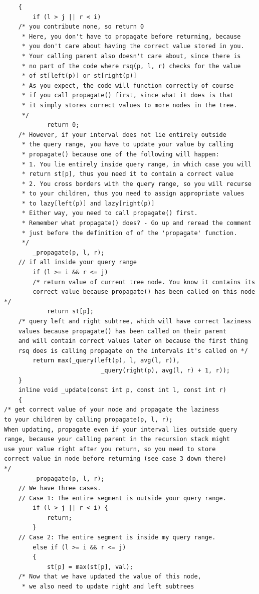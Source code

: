 \documentclass[12pt]{book}
\begin{document}
\begin{verbatim}
	{
		if (l > j || r < i)
	/* you contribute none, so return 0
	 * Here, you don't have to propagate before returning, because
	 * you don't care about having the correct value stored in you.
	 * Your calling parent also doesn't care about, since there is
	 * no part of the code where rsq(p, l, r) checks for the value
	 * of st[left(p)] or st[right(p)]
	 * As you expect, the code will function correctly of course
	 * if you call propagate() first, since what it does is that
	 * it simply stores correct values to more nodes in the tree.
	 */
			return 0;
	/* However, if your interval does not lie entirely outside
	 * the query range, you have to update your value by calling
	 * propagate() because one of the following will happen:
	 * 1. You lie entirely inside query range, in which case you will
	 * return st[p], thus you need it to contain a correct value
	 * 2. You cross borders with the query range, so you will recurse
	 * to your children, thus you need to assign appropriate values
	 * to lazy[left(p)] and lazy[right(p)]
	 * Either way, you need to call propagate() first.
	 * Remember what propagate() does? - Go up and reread the comment
	 * just before the definition of of the 'propagate' function.
	 */
		_propagate(p, l, r);
	// if all inside your query range
		if (l >= i && r <= j)
		/* return value of current tree node. You know it contains its
		correct value because propagate() has been called on this node */
			return st[p];
	/* query left and right subtree, which will have correct laziness
	values because propagate() has been called on their parent
	and will contain correct values later on because the first thing
	rsq does is calling propagate on the intervals it's called on */
		return max(_query(left(p), l, avg(l, r)),
                           _query(right(p), avg(l, r) + 1, r));
	}
	inline void _update(const int p, const int l, const int r)
	{
/* get correct value of your node and propagate the laziness
to your children by calling propagate(p, l, r);
When updating, propagate even if your interval lies outside query
range, because your calling parent in the recursion stack might
use your value right after you return, so you need to store
correct value in node before returning (see case 3 down there)
*/
		_propagate(p, l, r);
	// We have three cases.
	// Case 1: The entire segment is outside your query range.
		if (l > j || r < i) {
			return;
		}
	// Case 2: The entire segment is inside my query range.
		else if (l >= i && r <= j)
		{
			st[p] = max(st[p], val);
	/* Now that we have updated the value of this node,
	 * we also need to update right and left subtrees

\end{verbatim}
\end{document}
